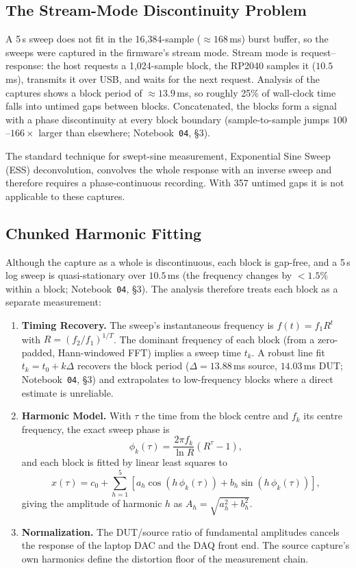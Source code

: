 \documentclass[11pt, a4paper]{report}
\begin{document}
\subsection{The Stream-Mode Discontinuity Problem}
A 5\,s sweep does not fit in the 16,384-sample ($\approx 168$\,ms) burst buffer, so the sweeps were captured in the firmware's stream mode. Stream mode is request--response: the host requests a 1,024-sample block, the RP2040 samples it ($10.5$\,ms), transmits it over USB, and waits for the next request. Analysis of the captures shows a block period of $\approx 13.9$\,ms, so roughly 25\% of wall-clock time falls into untimed gaps between blocks. Concatenated, the blocks form a signal with a phase discontinuity at every block boundary (sample-to-sample jumps $100$--$166\times$ larger than elsewhere; Notebook~\texttt{04}, \S3).

The standard technique for swept-sine measurement, Exponential Sine Sweep (ESS) deconvolution,\cite{farina2000_swept_sine} convolves the whole response with an inverse sweep and therefore requires a phase-continuous recording. With 357 untimed gaps it is not applicable to these captures.

\subsection{Chunked Harmonic Fitting}
Although the capture as a whole is discontinuous, each block is gap-free, and a 5\,s log sweep is quasi-stationary over $10.5$\,ms (the frequency changes by $<1.5\%$ within a block; Notebook~\texttt{04}, \S3). The analysis therefore treats each block as a separate measurement:

\begin{enumerate}
  \item \textbf{Timing Recovery.} The sweep's instantaneous frequency is $f(t) = f_1 R^{t}$ with $R = (f_2/f_1)^{1/T}$. The dominant frequency of each block (from a zero-padded, Hann-windowed FFT) implies a sweep time $t_k$. A robust line fit $t_k = t_0 + k\Delta$ recovers the block period ($\Delta = 13.88$\,ms source, $14.03$\,ms DUT; Notebook~\texttt{04}, \S3) and extrapolates to low-frequency blocks where a direct estimate is unreliable.
  \item \textbf{Harmonic Model.} With $\tau$ the time from the block centre and $f_k$ its centre frequency, the exact sweep phase is
    \begin{equation}
      \phi_k(\tau) = \frac{2\pi f_k}{\ln R}\left(R^{\tau} - 1\right),
    \end{equation}
    and each block is fitted by linear least squares to
    \begin{equation}
      x(\tau) = c_0 + \sum_{h=1}^{5} \left[a_h \cos\left(h\,\phi_k(\tau)\right) + b_h \sin\left(h\,\phi_k(\tau)\right)\right],
    \end{equation}
    giving the amplitude of harmonic $h$ as $A_h = \sqrt{a_h^2 + b_h^2}$.
  \item \textbf{Normalization.} The DUT/source ratio of fundamental amplitudes cancels the response of the laptop DAC and the DAQ front end. The source capture's own harmonics define the distortion floor of the measurement chain.
\end{enumerate}
\end{document}
